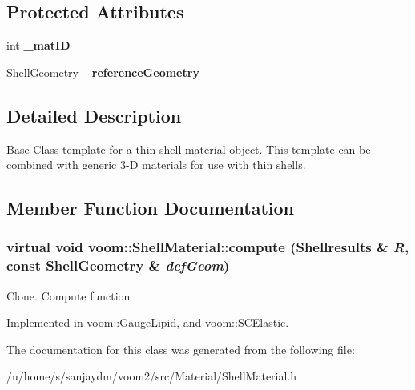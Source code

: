 \subsection*{Protected Attributes}
\begin{DoxyCompactItemize}
\item 
\hypertarget{classvoom_1_1_shell_material_a820986a30d669f619417be28ede17108}{
int {\bfseries \_\-matID}}
\label{classvoom_1_1_shell_material_a820986a30d669f619417be28ede17108}

\item 
\hypertarget{classvoom_1_1_shell_material_a6d29826d931de0213080407af5c21e80}{
\hyperlink{classvoom_1_1_shell_geometry}{ShellGeometry} {\bfseries \_\-referenceGeometry}}
\label{classvoom_1_1_shell_material_a6d29826d931de0213080407af5c21e80}

\end{DoxyCompactItemize}


\subsection{Detailed Description}
Base Class template for a thin-\/shell material object. This template can be combined with generic 3-\/D materials for use with thin shells. 

\subsection{Member Function Documentation}
\hypertarget{classvoom_1_1_shell_material_a959c8ad040d53a39218a7dbe6258472d}{
\subsubsection[{compute}]{\setlength{\rightskip}{0pt plus 5cm}virtual void voom::ShellMaterial::compute ({\bf Shellresults} \& {\em R}, \/  const {\bf ShellGeometry} \& {\em defGeom})}}
\label{classvoom_1_1_shell_material_a959c8ad040d53a39218a7dbe6258472d}


Clone. Compute function 

Implemented in \hyperlink{classvoom_1_1_gauge_lipid_a6df143b4e032baa83cf98cdf00a5d739}{voom::GaugeLipid}, and \hyperlink{classvoom_1_1_s_c_elastic_ab492944d398efffa67fa3763a1cbd7fc}{voom::SCElastic}.

The documentation for this class was generated from the following file:\begin{DoxyCompactItemize}
\item 
/u/home/s/sanjaydm/voom2/src/Material/ShellMaterial.h\end{DoxyCompactItemize}
